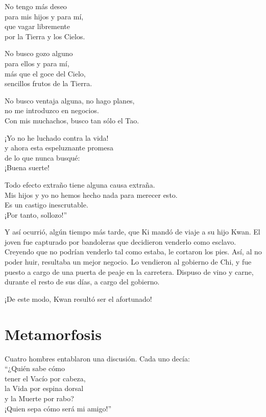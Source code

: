 \documentclass[hidelinks]{memoir}
\begin{document}
	No tengo más deseo\\
	para mis hijos y para mí,\\
	que vagar libremente\\
	por la Tierra y los Cielos.
	
	No busco gozo alguno\\
	para ellos y para mí,\\
	más que el goce del Cielo,\\
	sencillos frutos de la Tierra.
	
	No busco ventaja alguna, no hago planes,\\
	no me introduzco en negocios.\\
	Con mis muchachos, busco tan sólo el Tao.
	
	¡Yo no he luchado contra la vida!\\
	y ahora esta espeluznante promesa\\
	de lo que nunca busqué:\\
	¡Buena suerte!
	
	Todo efecto extraño tiene alguna causa extraña.\\
	Mis hijos y yo no hemos hecho nada para merecer esto.\\
	Es un castigo inescrutable.\\
	¡Por tanto, sollozo!''
	
	Y así ocurrió, algún tiempo más tarde, que Ki mandó de viaje a su hijo
	Kwan. El joven fue capturado por bandoleras que decidieron venderlo como
	esclavo. Creyendo que no podrían venderlo tal como estaba, le cortaron
	los pies. Así, al no poder huir, resultaba un mejor negocio. Lo
	vendieron al gobierno de Chi, y fue puesto a cargo de una puerta de
	peaje en la carretera. Dispuso de vino y carne, durante el resto de sus
	días, a cargo del gobierno.
	
	¡De este modo, Kwan resultó ser el afortunado!
	
	\chapter*{Metamorfosis}
	
	Cuatro hombres entablaron una discusión. Cada uno decía:\\
	``¿Quién sabe cómo\\
	tener el Vacío por cabeza,\\
	la Vida por espina dorsal\\
	y la Muerte por rabo?\\
	¡Quien sepa cómo será mi amigo!''
	
\end{document}
